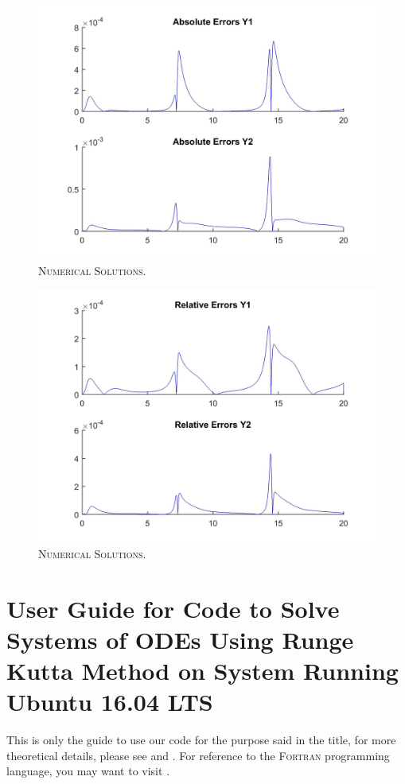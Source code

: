 \documentclass[a4paper,oneside]{book}
\numberwithin{equation}{chapter}
\begin{document}
\begin{figure}[H]
\centering
\includegraphics[scale=0.18]{imp3}
\caption{\textsc{Numerical Solutions.}}
\end{figure}
\begin{figure}[H]
\centering
\includegraphics[scale=0.18]{imp4}
\caption{\textsc{Numerical Solutions.}}
\end{figure}









\appendix
\chapter{User Guide for Code to Solve Systems of ODEs Using Runge Kutta Method on System Running Ubuntu 16.04 LTS}
This is only the guide to use our code for the purpose said in the title, for more theoretical details, please see \cite{user1} and \cite{user2}. For reference to the \textsc{Fortran} programming language, you may want to visit \cite{user3}.
\end{document}
